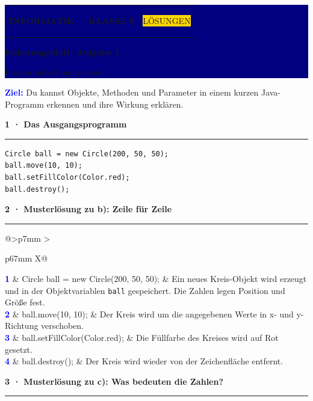 \documentclass[10pt,a4paper]{article}
\newcommand{\sectiontitle}[2]{%
  \vspace{3mm}
  {\color{#1}\bfseries\large #2}\par
  \vspace{1mm}
  {\color{#1}\rule{\linewidth}{0.7pt}}\par
  \vspace{1.5mm}
}
\newcommand{\solutionrow}[3]{%
  \textcolor{Blue}{\bfseries #1} &
  \ttfamily\small #2 &
  \small #3 \\[2.3mm]
}
\begin{document}
\colorbox{Navy}{%
  \parbox{\dimexpr\linewidth-2\fboxsep\relax}{%
    \vspace{3mm}
    \color{white}
    \begin{tabularx}{\linewidth}{@{}Xr@{}}
      {\small\bfseries INFORMATIK · KLASSE 9} &
      \colorbox{Gold}{\color{Navy}\small\bfseries\strut LÖSUNGEN}
    \end{tabularx}
    \vspace{2.5mm}

    {\fontsize{22}{25}\selectfont\bfseries Sicherungsblatt: Aufgabe 1}\par
    \vspace{1mm}
    {\large Programmtext analysieren}
    \vspace{3mm}
  }%
}

\vspace{3mm}
\colorbox{Sky}{%
  \parbox{\dimexpr\linewidth-2\fboxsep\relax}{%
    \vspace{1.8mm}
    \textcolor{Blue}{\bfseries Ziel:}
    Du kannst Objekte, Methoden und Parameter in einem kurzen Java-Programm
    erkennen und ihre Wirkung erklären.
    \vspace{1.8mm}
  }%
}

\sectiontitle{Blue}{1 · Das Ausgangsprogramm}

\begin{lstlisting}
Circle ball = new Circle(200, 50, 50);
ball.move(10, 10);
ball.setFillColor(Color.red);
ball.destroy();
\end{lstlisting}

\sectiontitle{Blue}{2 · Musterlösung zu b): Zeile für Zeile}

\renewcommand{\arraystretch}{1.05}
\begin{tabularx}{\linewidth}{@{}>{\centering\arraybackslash}p{7mm} >{\raggedright\arraybackslash}p{67mm} X@{}}
  \solutionrow{1}{Circle ball = new Circle(200, 50, 50);}{Ein neues Kreis-Objekt wird erzeugt und in der Objektvariablen \texttt{ball} gespeichert. Die Zahlen legen Position und Größe fest.}
  \solutionrow{2}{ball.move(10, 10);}{Der Kreis wird um die angegebenen Werte in x- und y-Richtung verschoben.}
  \solutionrow{3}{ball.setFillColor(Color.red);}{Die Füllfarbe des Kreises wird auf Rot gesetzt.}
  \solutionrow{4}{ball.destroy();}{Der Kreis wird wieder von der Zeichenfläche entfernt.}
\end{tabularx}

\sectiontitle{Blue}{3 · Musterlösung zu c): Was bedeuten die Zahlen?}
\end{document}
